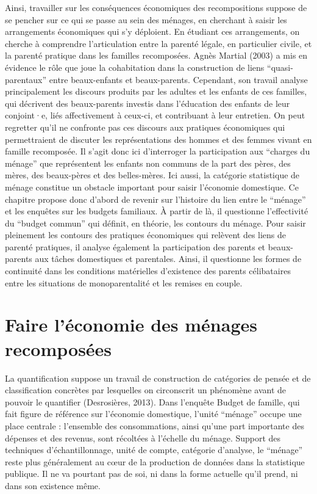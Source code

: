 \documentclass[
  12pt,
]{book}
\begin{document}
Ainsi, travailler sur les conséquences économiques des recompositions
suppose de se pencher sur ce qui se passe au sein des ménages, en
cherchant à saisir les arrangements économiques qui s'y déploient. En
étudiant ces arrangements, on cherche à comprendre l'articulation entre
la parenté légale, en particulier civile, et la parenté pratique dans
les familles recomposées. Agnès Martial (2003) a mis en évidence le rôle
que joue la cohabitation dans la construction de liens
``quasi-parentaux'' entre beaux-enfants et beaux-parents. Cependant, son
travail analyse principalement les discours produits par les adultes et
les enfants de ces familles, qui décrivent des beaux-parents investis
dans l'éducation des enfants de leur conjoint·e, liés affectivement à
ceux-ci, et contribuant à leur entretien. On peut regretter qu'il ne
confronte pas ces discours aux pratiques économiques qui permettraient
de discuter les représentations des hommes et des femmes vivant en
famille recomposée. Il s'agit donc ici d'interroger la participation aux
``charges du ménage'' que représentent les enfants non communs de la
part des pères, des mères, des beaux-pères et des belles-mères. Ici
aussi, la catégorie statistique de ménage constitue un obstacle
important pour saisir l'économie domestique. Ce chapitre propose donc
d'abord de revenir sur l'histoire du lien entre le ``ménage'' et les
enquêtes sur les budgets familiaux. À partir de là, il questionne
l'effectivité du ``budget commun'' qui définit, en théorie, les contours
du ménage. Pour saisir pleinement les contours des pratiques économiques
qui relèvent des liens de parenté pratiques, il analyse également la
participation des parents et beaux-parents aux tâches domestiques et
parentales. Ainsi, il questionne les formes de continuité dans les
conditions matérielles d'existence des parents célibataires entre les
situations de monoparentalité et les remises en couple.

\section{Faire l'économie des ménages
recomposées}\label{faire-luxe9conomie-des-muxe9nages-recomposuxe9es}

La quantification suppose un travail de construction de catégories de
pensée et de classification concrètes par lesquelles on circonscrit un
phénomène avant de pouvoir le quantifier (Desrosières, 2013). Dans
l'enquête Budget de famille, qui fait figure de référence sur l'économie
domestique, l'unité ``ménage'' occupe une place centrale : l'ensemble
des consommations, ainsi qu'une part importante des dépenses et des
revenus, sont récoltées à l'échelle du ménage. Support des techniques
d'échantillonnage, unité de compte, catégorie d'analyse, le ``ménage''
reste plus généralement au cœur de la production de données dans la
statistique publique. Il ne va pourtant pas de soi, ni dans la forme
actuelle qu'il prend, ni dans son existence même.
\end{document}
